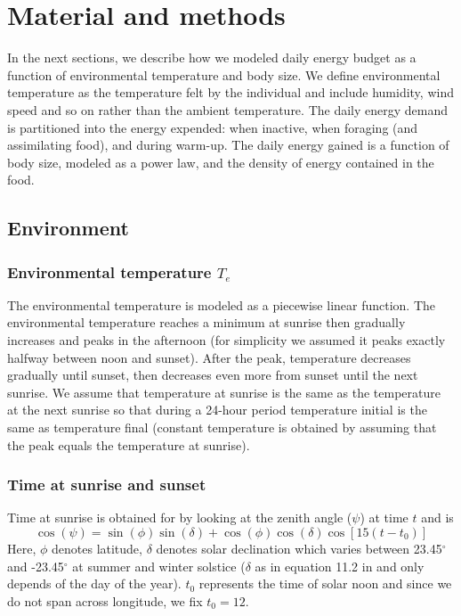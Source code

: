 \section*{Material and methods}
In the next sections, we describe how we modeled daily energy budget as a function of environmental temperature and body size.
We define environmental temperature as the temperature felt by the individual and include humidity, wind speed  and so on rather than the ambient temperature.
The daily energy demand is partitioned into the energy expended: when inactive, when foraging (and assimilating food), and during warm-up.
The daily energy gained is a function of body size, modeled as a power law, and the density of energy contained in the food. 

\subsection*{Environment}
\subsubsection*{Environmental temperature $T_e$}
The environmental temperature is modeled as a piecewise linear function.
The environmental temperature reaches a minimum at sunrise then gradually increases and peaks in the afternoon (for simplicity we assumed it peaks exactly halfway between noon and sunset).
After the peak, temperature decreases gradually until sunset, then decreases even more from sunset until the next sunrise.
We assume that temperature at sunrise is the same as the temperature at the next sunrise so that during a 24-hour period  temperature initial is the same as temperature final (constant temperature is obtained  by assuming that the peak equals the temperature at sunrise). 

\subsubsection*{Time at sunrise and sunset}
Time at sunrise is obtained for \citet{Campbell2012} by looking at the zenith angle ($\psi$) at time $t$ and is
\begin{equation}  \label{eq:psi}
\cos(\psi) = \sin(\phi) \sin(\delta) + \cos(\phi) \cos(\delta) \cos[15 (t- t_0)] 
\end{equation}
Here, $\phi$ denotes latitude, $\delta$ denotes solar declination which varies between 23.45$^\circ$ and  -23.45$^\circ$ at summer and winter solstice 
($\delta$ as in equation 11.2 in \citet{Campbell2012} and only depends of the day of the year). 
$t_0$ represents the time of solar noon and since we do not span across longitude, we fix $t_0 = 12$.

